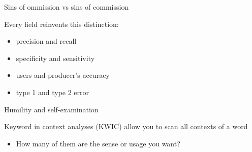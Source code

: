 \documentclass{hertieteaching}
\begin{document}
\begin{frame}{Sins of ommission vs sins of commission}
\protect\hypertarget{sins-of-ommission-vs-sins-of-commission}{}

Every field reinvents this distinction:

\begin{itemize}
\item
  precision and recall\item
  specificity and sensitivity\item
  users and producer's accuracy\item
  type 1 and type 2 error
\end{itemize}

\end{frame}

\begin{frame}{Humility and self-examination}
\protect\hypertarget{humility-and-self-examination}{}

Keyword in context analyses (KWIC) allow you to scan all contexts of a
word

\begin{itemize}
\item
  How many of them are the sense or usage you want?
\end{itemize}

\end{frame}
\end{document}
